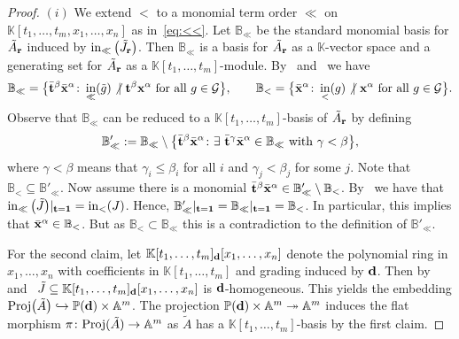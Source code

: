 \documentclass[pdftex]{sigma}%
\numberwithin{equation}{section}
\DeclareMathOperator{\init}{in}
\begin{document}
\begin{proof}
$(i)$ We extend $<$ to a monomial term order $\ll$ on $\mathbb K[t_1,\dots,t_m,x_1,\dots,x_n]$ as in~\eqref{eq:<<}.
 Let $\mathbb B_{\ll}$ be the standard monomial basis for $\tilde A_{\bf r}$ induced by $\init_{\ll}\big(\tilde J_{\bf r}\big)$.
 Then $\mathbb B_{\ll}$ is a basis for $\tilde A_{\bf r}$ as a $\mathbb{K}$-vector space and a generating set for $\tilde A_{\bf r}$ as a $\mathbb K[t_1,\dots,t_m]$-module.
 By~ and~\cite[Proposition 1.1.5]{herzog2011monomial} we have
 \begin{gather*}
 \mathbb B_{\ll} = \big\{\bar {\bf t}^\beta\bar {\bf x}^\alpha \colon \init_{\ll}(\tilde g)\not\vert \ {\bf t}^\beta{\bf x}^\alpha \text{ for all }g\in \mathcal G\big\},\qquad
 \mathbb B_{<} = \big\{\bar {\bf x}^\alpha \colon \init_{<}(g)\not\vert \ {\bf x}^\alpha \text{ for all }g\in \mathcal G\big\}.
 \end{gather*}
 Observe that $\mathbb B_{\ll}$ can be reduced to a $\mathbb K[t_1,\dots,t_m]$-basis of $\tilde A_{\bf r}$ by defining
 \begin{displaymath}
 \mathbb B'_{\ll}:= \mathbb B_{\ll} \setminus \big\{\bar{\bf t}^\beta\bar{\bf x}^\alpha \colon \exists \ \bar{\bf t}^{\gamma}\bar{\bf x}^\alpha\in \mathbb B_{\ll} \text{ with } \gamma < \beta\big\},
 \end{displaymath}
 where $\gamma < \beta$ means that $\gamma_i\le \beta_i$ for all $i$ and $\gamma_j<\beta_j$ for some $j$. Note that $\mathbb B_{<}\subseteq \mathbb B'_{\ll}$.
 Now assume there is a monomial $\bar{\bf t}^\beta\bar{\bf x}^\alpha \in \mathbb B'_{\ll}\setminus \mathbb B_<$.
 By~ we have that $\init_{\ll}\big(\tilde J\big)\vert_{{\bf t}={\bf 1}}=\init_<(J)$.
 Hence, $\mathbb B'_{\ll}\vert_{{\bf t}={\bf 1}}=\mathbb B_{\ll}\vert_{{\bf t}={\bf 1}}=\mathbb B_<$.
 In particular, this implies that $\bar{\bf x}^\alpha\in \mathbb B_<$. But as $\mathbb B_<\subset \mathbb B_{\ll}$ this is a contradiction to the definition of $\mathbb B'_{\ll}$.

 For the second claim, let $\mathbb K[t_1,\dots,t_m]_{\bf d}[x_1,\dots,x_n]$ denote the polynomial ring in $x_1,\dots,x_n$ with coefficients in $\mathbb K[t_1,\dots,t_m]$ and grading induced by ${\bf d}$.
 Then by~ and~ $\tilde J\subseteq \mathbb K[t_1,\dots,t_m]_{\bf d}[x_1,\dots,x_n]$ is ${\bf d}$-homogeneous.
 This yields the embedding ${\rm Proj}\big(\tilde A\big)\hookrightarrow \mathbb P({\bf d})\times \mathbb A^m$.
 The projection $\mathbb P({\bf d})\times \mathbb A^m\twoheadrightarrow \mathbb A^m$ induces the flat morphism $\pi\colon {\rm Proj}(\tilde A)\to \mathbb A^m$ as $\tilde A$ has a $\mathbb K[t_1,\dots,t_m]$-basis by the first claim.


\end{proof}
\end{document}
